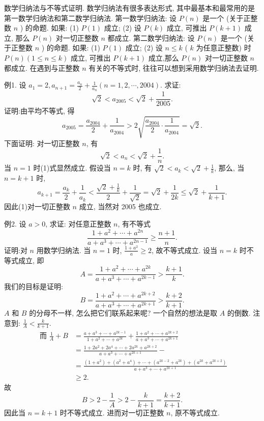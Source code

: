 
数学归纳法与不等式证明.
数学归纳法有很多表达形式, 其中最基本和最常用的是第一数学归纳法和第二数学归纳法.
第一数学归纳法: 设 $P(n)$ 是一个 (关于正整数 $n$ ) 的命题.
如果:
(1) $P(1)$ 成立; (2) 设 $P(k)$ 成立, 可推出 $P(k+1)$ 成立, 那么 $P(n)$ 对一切正整数 $n$ 都成立.
第二数学归纳法: 设 $P(n)$ 是一个 (关于正整数 $n$ ) 的命题.
如果:
(1) $P(1)$ 成立; (2) 设 $n \leqslant k$ ( $k$ 为任意正整数) 时 $P(n)(1 \leqslant n \leqslant k)$ 成立, 可推出 $P(k+1)$ 成立,那么 $P(n)$ 对一切正整数 $n$ 都成立.
在遇到与正整数 $n$ 有关的不等式时, 往往可以想到采用数学归纳法去证明.



例1. 设 $a_1=2, a_{n+1}=\frac{a_n}{2}+\frac{1}{a_n}(n=1,2, \cdots, 2004)$. 求证:
$$
\sqrt{2}<a_{2005}<\sqrt{2}+\frac{1}{2005} .
$$
证明:由平均不等式, 得
$$
a_{2005}=\frac{a_{2004}}{2}+\frac{1}{a_{2004}}>2 \sqrt{\frac{a_{2004}}{2} \cdot \frac{1}{a_{2004}}}=\sqrt{2} .
$$
下面证明: 对一切正整数 $n$, 有
$$
\sqrt{2}<a_n<\sqrt{2}+\frac{1}{n} . \label{(1)}
$$
当 $n=1$ 时(1)式显然成立.
假设当 $n=k$ 时, 有 $\sqrt{2}<a_k<\sqrt{2}+\frac{1}{k}$, 那么, 当 $n=k+1$ 时,
$$
a_{k+1}=\frac{a_k}{2}+\frac{1}{a_k}<\frac{\sqrt{2}+\frac{1}{k}}{2}+\frac{1}{\sqrt{2}}=\sqrt{2}+\frac{1}{2 k} \leqslant \sqrt{2}+\frac{1}{k+1} .
$$
因此(1)对一切正整数 $n$ 成立, 当然对 2005 也成立.



例2. 设 $a>0$, 求证: 对任意正整数 $n$, 有不等式
$$
\frac{1+a^2+\cdots+a^{2 n}}{a+a^3+\cdots+a^{2 n-1}} \geqslant \frac{n+1}{n} .
$$
证明:对 $n$ 用数学归纳法.
当 $n=1$ 时, $\frac{1+a^2}{a} \geqslant 2$, 故不等式成立.
设当 $n=k$ 时不等式成立, 即
$$
A=\frac{1+a^2+\cdots+a^{2 k}}{a+a^3+\cdots+a^{2 k-1}}>\frac{k+1}{k} .
$$
我们的目标是证明:
$$
B=\frac{1+a^2+\cdots+a^{2 k+2}}{a+a^3+\cdots+a^{2 k+1}}>\frac{k+2}{k+1} .
$$
$A$ 和 $B$ 的分母不一样, 怎么把它们联系起来呢? 一个自然的想法是取 $A$ 的倒数.
注意到: $\frac{1}{A}<\frac{k}{k+1}$.
$$
\begin{aligned}
\text { 而 } \frac{1}{A}+B & =\frac{a+a^3+\cdots+a^{2 k-1}}{1+a^2+\cdots+a^{2 k}}+\frac{1+a^2+\cdots+a^{2 k+2}}{a+a^3+\cdots+a^{2 k+1}} \\
& =\frac{1+2 a^2+2 a^4+\cdots+2 a^{2 k}+a^{2 k+2}}{a+a^3+\cdots+a^{2 k+1}}- \\
& =\frac{\left(1+a^2\right)+\left(a^2+a^4\right)+\cdots+\left(a^{2 k-2}+a^{2 k}\right)+\left(a^{2 k}+a^{2 k+2}\right)}{a+a^3+\cdots+a^{2 k+1}} \\
& \geqslant 2 .
\end{aligned}
$$
故
$$
B>2-\frac{1}{A}>2-\frac{k}{k+1}=\frac{k+2}{k+1} .
$$
因此当 $n=k+1$ 时不等式成立.
进而对一切正整数 $n$, 原不等式成立.



